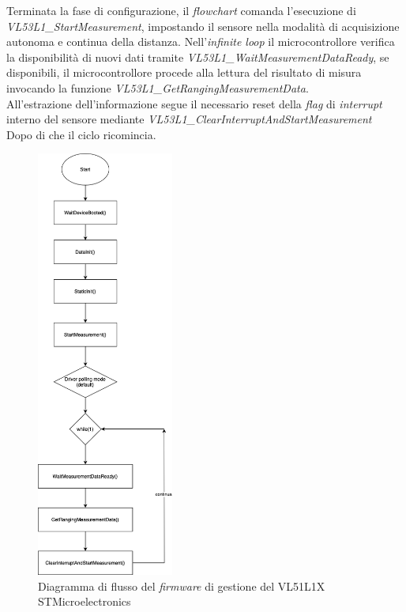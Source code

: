 Terminata la fase di configurazione, il \textit{flowchart} comanda l'esecuzione di\\\textit{VL53L1\_StartMeasurement}, impostando il sensore nella modalità di acquisizione autonoma e continua della distanza.
Nell'\textit{infinite loop} il microcontrollore verifica la disponibilità di nuovi dati tramite \textit{VL53L1\_WaitMeasurementDataReady}, se disponibili, il microcontrollore procede alla lettura del risultato di misura invocando la funzione \textit{VL53L1\_GetRangingMeasurementData}.\\
All'estrazione dell'informazione segue il necessario reset della \textit{flag} di \textit{interrupt} interno del sensore mediante \textit{VL53L1\_ClearInterruptAndStartMeasurement}\\
Dopo di che il ciclo ricomincia.


\begin{figure}[H]
    \centering
    \includegraphics[width=0.4\textwidth,keepaspectratio]{figures copia/VL53L1X_DiagrammaDiFlusso.drawio.png}
    \caption{Diagramma di flusso del \textit{firmware} di gestione del VL51L1X STMicroelectronics}
    \label{fig:diagramma 2.2}
\end{figure}


